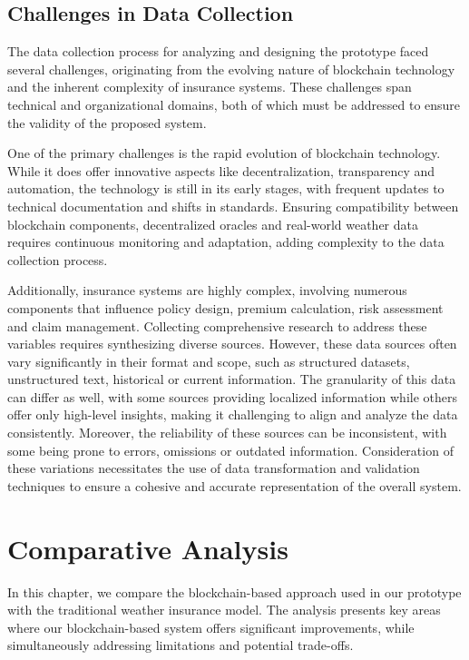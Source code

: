 \subsection{Challenges in Data Collection}
The data collection process for analyzing and designing the prototype faced several challenges, originating from the evolving nature of blockchain technology and the inherent complexity of insurance systems. These challenges span technical and organizational domains, both of which must be addressed to ensure the validity of the proposed system.

One of the primary challenges is the rapid evolution of blockchain technology. While it does offer innovative aspects like decentralization, transparency and automation, the technology is still in its early stages, with frequent updates to technical documentation and shifts in standards. Ensuring compatibility between blockchain components, decentralized oracles and real-world weather data requires continuous monitoring and adaptation, adding complexity to the data collection process.

Additionally, insurance systems are highly complex, involving numerous components that influence policy design, premium calculation, risk assessment and claim management. Collecting comprehensive research to address these variables requires synthesizing diverse sources. However, these data sources often vary significantly in their format and scope, such as structured datasets, unstructured text, historical or current information. The granularity of this data can differ as well, with some sources providing localized information while others offer only high-level insights, making it challenging to align and analyze the data consistently. Moreover, the reliability of these sources can be inconsistent, with some being prone to errors, omissions or outdated information. Consideration of these variations necessitates the use of data transformation and validation techniques to ensure a cohesive and accurate representation of the overall system.

\section{Comparative Analysis}\label{comparitive_analysis}
In this chapter, we compare the blockchain-based approach used in our prototype with the traditional weather insurance model. The analysis presents key areas where our blockchain-based system offers significant improvements, while simultaneously addressing limitations and potential trade-offs.

